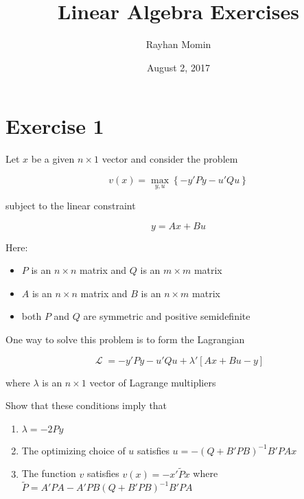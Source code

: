 \documentclass[10pt,letter]{article}
\newcommand{\Lagr}{\mathop{\mathcal{L}}}
\begin{document}


\title{Linear Algebra Exercises}

\author{Rayhan Momin}

\date{August 2, 2017}
 
\maketitle 

\section*{Exercise 1}

\begin{flushleft}
Let $x$ be a given $n \times 1$ vector and consider the problem


\[v(x) =  \max_{y,u} \left\{ - y'P y - u' Q u \right\}\]


subject to the linear constraint


\[y = Ax + Bu\]


Here: 


\begin{itemize}
  \item $P$ is an $n \times n$ matrix and $Q$ is an $m \times m$ matrix
  \item $A$ is an $n \times n$ matrix and $B$ is an $n \times m$ matrix
  \item both $P$ and $Q$ are symmetric and positive semidefinite
\end{itemize}


One way to solve this problem is to form the Lagrangian

\[\Lagr = - y' P y - u' Q u + \lambda' \left[A x + B u - y\right]\]


where $\lambda$ is an $n \times 1$ vector of Lagrange multipliers

Show that these conditions imply that

\begin{enumerate}
\item $\lambda = -2Py$
\item The optimizing choice of $u$ satisfies $u = - (Q + B' P B)^{-1} B' P A x$
\item The function $v$ satisfies $v(x) = - x' \tilde P x$ where $\tilde P = A' P A - A'P B (Q + B'P B)^{-1} B' P A$
\end{enumerate}

\end{flushleft}
\end{document}

